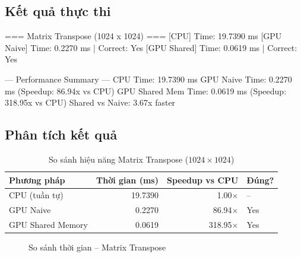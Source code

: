 \documentclass[12pt,a4paper]{article}
\begin{document}
\subsection{Kết quả thực thi}

\begin{outputbox}
=== Matrix Transpose (1024 x 1024) ===
[CPU]          Time: 19.7390 ms
[GPU Naive]    Time: 0.2270 ms  |  Correct: Yes
[GPU Shared]   Time: 0.0619 ms  |  Correct: Yes

--- Performance Summary ---
CPU Time:              19.7390 ms
GPU Naive Time:        0.2270 ms  (Speedup: 86.94x vs CPU)
GPU Shared Mem Time:   0.0619 ms  (Speedup: 318.95x vs CPU)
Shared vs Naive:       3.67x faster
\end{outputbox}

\subsection{Phân tích kết quả}

\begin{table}[H]
\centering
\begin{tabular}{lrrl}
\toprule
\textbf{Phương pháp} & \textbf{Thời gian (ms)} & \textbf{Speedup vs CPU} & \textbf{Đúng?} \\
\midrule
CPU (tuần tự)         & 19.7390 & 1.00$\times$   & -- \\
GPU Naive             &  0.2270 & 86.94$\times$  & Yes \\
GPU Shared Memory     &  0.0619 & 318.95$\times$ & Yes \\
\bottomrule
\end{tabular}
\caption{So sánh hiệu năng Matrix Transpose ($1024 \times 1024$)}
\end{table}

\begin{figure}[H]
\centering
{}
\caption{So sánh thời gian -- Matrix Transpose}
\end{figure}
\end{document}

